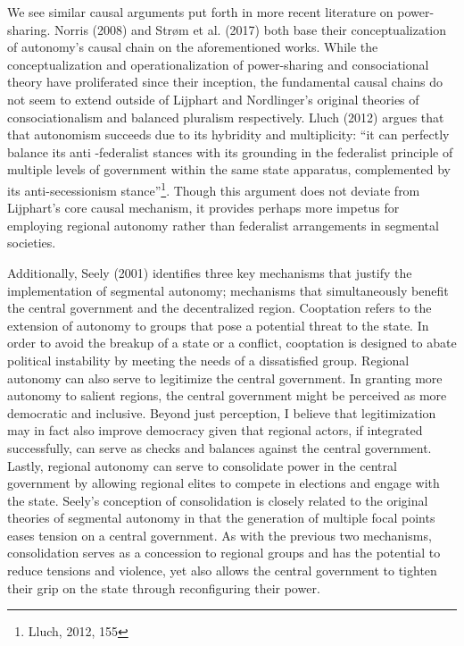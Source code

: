 \documentclass[12pt]{article}
\begin{document}
We see similar causal arguments put forth in more recent literature on power-sharing. Norris (2008) and Strøm et al. (2017) both base their conceptualization of autonomy’s causal chain on the aforementioned works. While the conceptualization and operationalization of power-sharing and consociational theory have proliferated since their inception, the fundamental causal chains do not seem to extend outside of Lijphart and Nordlinger’s original theories of consociationalism and balanced pluralism respectively. Lluch (2012) argues that that autonomism succeeds due to its hybridity and multiplicity: “it can perfectly balance its anti -federalist stances with its grounding in the federalist principle of multiple levels of government within the same state apparatus, complemented by its anti-secessionism stance”\footnote{Lluch, 2012, 155}. Though this argument does not deviate from Lijphart’s core causal mechanism, it provides perhaps more impetus for employing regional autonomy rather than federalist arrangements in segmental societies. 

Additionally, Seely (2001) identifies three key mechanisms that justify the implementation of segmental autonomy; mechanisms that simultaneously benefit the central government and the decentralized region. Cooptation refers to the extension of autonomy to groups that pose a potential threat to the state. In order to avoid the breakup of a state or a conflict, cooptation is designed to abate political instability by meeting the needs of a dissatisfied group. Regional autonomy can also serve to legitimize the central government. In granting more autonomy to salient regions, the central government might be perceived as more democratic and inclusive. Beyond just perception, I believe that legitimization may in fact also improve democracy given that regional actors, if integrated successfully, can serve as checks and balances against the central government. Lastly, regional autonomy can serve to consolidate power in the central government by allowing regional elites to compete in elections and engage with the state. Seely's conception of consolidation is closely related to the original theories of segmental autonomy in that the generation of multiple focal points eases tension on a central government. As with the previous two mechanisms, consolidation serves as a concession to regional groups and has the potential to reduce tensions and violence, yet also allows the central government to tighten their grip on the state through reconfiguring their power. 
\end{document}
